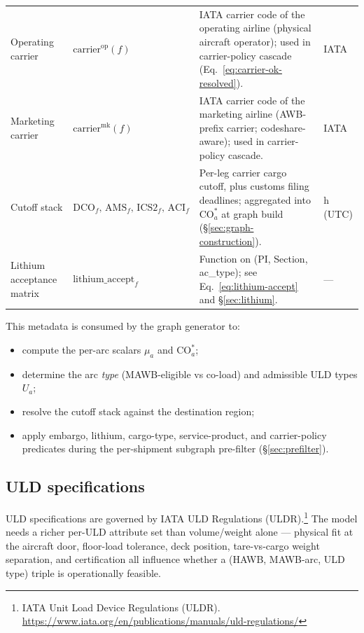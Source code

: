 \documentclass[11pt,a4paper]{article}
\theoremstyle{definition}
\begin{document}
\begin{table}[H]
\begin{tabular}{p{2.8cm}p{2.5cm}p{7cm}p{1.5cm}}
Operating carrier & $\text{carrier}^{\text{op}}(f)$ & IATA carrier code of the operating airline (physical aircraft operator); used in carrier-policy cascade (Eq.~\ref{eq:carrier-ok-resolved}). & IATA \\
Marketing carrier & $\text{carrier}^{\text{mk}}(f)$ & IATA carrier code of the marketing airline (AWB-prefix carrier; codeshare-aware); used in carrier-policy cascade. & IATA \\
Cutoff stack & $\text{DCO}_f,\, \text{AMS}_f,\, \text{ICS2}_f,\, \text{ACI}_f$ & Per-leg carrier cargo cutoff, plus customs filing deadlines; aggregated into $\text{CO}_a^*$ at graph build (\S\ref{sec:graph-construction}). & h (UTC) \\
Lithium acceptance matrix & $\text{lithium\_accept}_f$ & Function on (PI, Section, ac\_type); see Eq.~\ref{eq:lithium-accept} and \S\ref{sec:lithium}. & --- \\
\bottomrule
\end{tabular}
\end{table}
This metadata is consumed by the graph generator to:
\begin{itemize}[noitemsep]
  \item compute the per-arc scalars $\mu_a$ and $\text{CO}_a^*$;
  \item determine the arc \emph{type} (MAWB-eligible vs co-load) and admissible
        ULD types $U_a$;
  \item resolve the cutoff stack against the destination region;
  \item apply embargo, lithium, cargo-type, service-product, and
        carrier-policy predicates during the per-shipment subgraph pre-filter
        (\S\ref{sec:prefilter}).
\end{itemize}

\subsection{ULD specifications}
\label{sec:uld-spec}

ULD specifications are governed by IATA ULD Regulations
(ULDR).\footnote{IATA Unit Load Device Regulations (ULDR).
\url{https://www.iata.org/en/publications/manuals/uld-regulations/}} The
model needs a richer per-ULD attribute set than volume/weight alone --- physical
fit at the aircraft door, floor-load tolerance, deck position, tare-vs-cargo
weight separation, and certification all influence whether a (HAWB, MAWB-arc,
ULD type) triple is operationally feasible.
\end{document}
